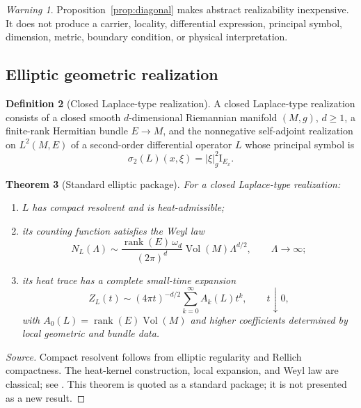 \documentclass[11pt,a4paper]{article}
\newtheorem{theorem}{Theorem}[section]
\theoremstyle{definition}
\newtheorem{definition}[theorem]{Definition}
\theoremstyle{remark}
\newtheorem{warning}[theorem]{Warning}
\newcommand{\rank}{\operatorname{rank}}
\newcommand{\Vol}{\operatorname{Vol}}
\newcommand{\Id}{\mathrm I}
\newcommand{\abs}[1]{\left\lvert #1\right\rvert}
\begin{document}
\begin{warning}
Proposition~\ref{prop:diagonal} makes abstract realizability inexpensive. It does not
produce a carrier, locality, differential expression, principal symbol,
dimension, metric, boundary condition, or physical interpretation.
\end{warning}

\subsection{Elliptic geometric realization}

\begin{definition}[Closed Laplace-type realization]
A closed Laplace-type realization consists of a closed smooth
\(d\)-dimensional Riemannian manifold \((M,g)\), \(d\geq1\), a finite-rank
Hermitian bundle
\(E\to M\), and the nonnegative self-adjoint realization on \(L^2(M,E)\) of a
second-order differential operator \(L\) whose principal symbol is
\[
 \sigma_2(L)(x,\xi)=\abs{\xi}_g^2\Id_{E_x}.
\]
\end{definition}

\begin{theorem}[Standard elliptic package]
\label{thm:elliptic}
For a closed Laplace-type realization:
\begin{enumerate}
\item \(L\) has compact resolvent and is heat-admissible;
\item its counting function satisfies the Weyl law
      \[
        N_L(\Lambda)
        \sim
        \frac{\rank(E)\,\omega_d}{(2\pi)^d}\Vol(M)\Lambda^{d/2},
        \qquad \Lambda\to\infty;
      \]
\item its heat trace has a complete small-time expansion
      \[
        Z_L(t)
        \sim
        (4\pi t)^{-d/2}
        \sum_{k=0}^\infty A_k(L)t^k,
        \qquad t\downarrow0,
      \]
      with \(A_0(L)=\rank(E)\Vol(M)\) and higher coefficients determined by
      local geometric and bundle data.
\end{enumerate}
\end{theorem}

\begin{proof}[Source]
Compact resolvent follows from elliptic regularity and Rellich compactness.
The heat-kernel construction, local expansion, and Weyl law are classical;
see \cite{MinakPleijel,Gilkey1975,Davies,BGV,Chavel,Seeley1967}. This theorem
is quoted as a standard package; it is not presented as a new result.
\end{proof}
\end{document}
